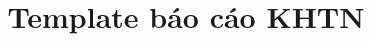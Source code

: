 %
%
%
% 
%
\title{Template báo cáo KHTN}

\documentclass[12pt]{article}
\usepackage[T5]{fontenc}
\usepackage[utf8]{inputenc}
\usepackage[vietnamese,english]{babel}
\usepackage{amsmath}
\usepackage{graphicx}
\usepackage[colorinlistoftodos]{todonotes}
\usepackage{listings}
\usepackage{hyperref}
\hypersetup{
    colorlinks=true,
    linkcolor=blue,
    filecolor=magenta,      
    urlcolor=cyan,
}

\renewcommand{\lstlistingname}{Mã }%
\addto\captionsenglish{\renewcommand{\figurename}{Hình}} %



